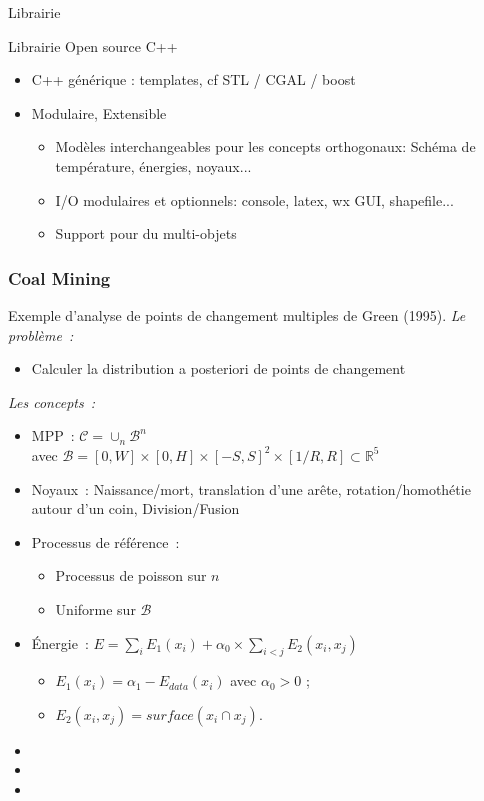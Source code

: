 \documentclass{beamer}
\begin{document}
\begin{frame}{Librairie}
\begin{block}{Librairie Open source C++}
\begin{itemize}
\item C++ générique : templates, cf  STL / CGAL / boost\\
\item Modulaire, Extensible
\begin{itemize}
 \item Modèles interchangeables pour les concepts orthogonaux: Schéma de température, énergies, noyaux...
 \item I/O modulaires et optionnels: console, latex, wx GUI, shapefile...
 \item Support pour du multi-objets
\end{itemize}
\end{itemize}
\end{block}

\end{frame}


\begin{frame}
\frametitle{Coal Mining}
Exemple d'analyse de points de changement multiples de Green (1995).
\emph{Le probl\`eme~:} 
\begin{itemize}
\item Calculer la distribution a posteriori de points de changement
\end{itemize}
\emph{Les concepts~:}
\begin{itemize}
\item MPP~:  $\mathcal{C} = \cup_{n}\mathcal{B}^n$\\
avec $\mathcal{B}=[0,W]\times[0,H]\times[-S,S]^2\times[1/R,R] \subset  \mathds{R}^{5}$
\item Noyaux~: Naissance/mort, translation d'une arête, rotation/homothétie autour d'un coin, Division/Fusion
\item Processus de référence~:
\begin{itemize}
\item Processus de poisson sur $n$
\item Uniforme sur $\mathcal{B}$
\end{itemize}
\item \'Energie~: $E = \sum_i E_1(x_i) + \alpha_{0} \times \sum_{i<j} E_2(x_i,x_j)$
\begin{itemize}
\item $E_1(x_i)=\alpha_{1} - E_{data}(x_i)$ avec $\alpha_{0}>0$ ;
\item $E_2(x_i,x_j) = surface(x_i \cap x_j)$.
\end{itemize}
\end{itemize}

\begin{itemize}
\item 
\item 
\item 
\end{itemize}
\end{frame}
\end{document}
